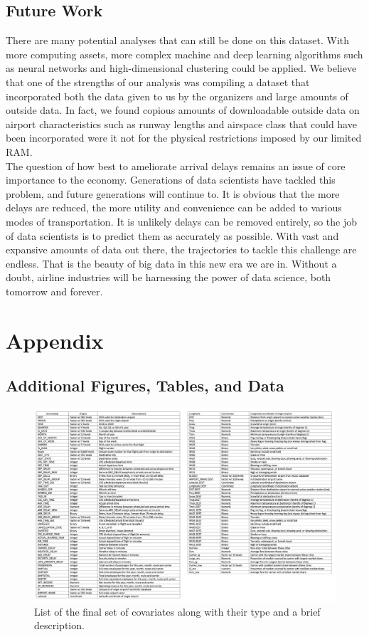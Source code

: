 \documentclass[12pt, a4paper, openany]{book}
\newcommand\tab[1][1cm]{\hspace*{#1}}
\begin{document}
	\section{Future Work}
	\tab There are many potential analyses that can still be done on this dataset. With more computing assets, more complex machine and deep learning algorithms such as neural networks and high-dimensional clustering could be applied. We believe that one of the strengths of our analysis was compiling a dataset that incorporated both the data given to us by the organizers and large amounts of outside data. In fact, we found copious amounts of downloadable outside data on airport characteristics such as runway lengths and airspace class that could have been incorporated were it not for the physical restrictions imposed by our limited RAM. \\
	\tab The question of how best to ameliorate arrival delays remains an issue of core importance to the economy. Generations of data scientists have tackled this problem, and future generations will continue to. It is obvious that the more delays are reduced, the more utility and convenience can be added to various modes of transportation. It is unlikely delays can be removed entirely, so the job of data scientists is to predict them as accurately as possible. With vast and expansive amounts of data out there, the trajectories to tackle this challenge are endless. That is the beauty of big data in this new era we are in. Without a doubt, airline industries will be harnessing the power of data science, both tomorrow and forever.
\chapter{Appendix}
	\section{Additional Figures, Tables, and Data}
			\begin{figure}[h]
			\centering
	 		\includegraphics[width = 1 \textwidth]{../figures/PLOTS FOR REPORT/Covariate List}
	 		\caption{List of the final set of covariates along with their type and a brief description.}
	 		\end{figure}
\end{document}
